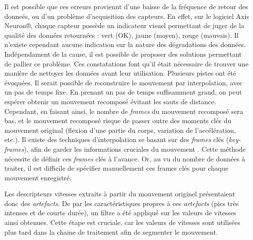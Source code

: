 Il est possible que ces erreurs proviennt d'une baisse de la fréquence de retour des donneés, ou d'un problème d'acquisition des capteurs. En effet, sur le logiciel Axis Neuron®, chaque capteur possède un indicateur visuel permettant de juger de la qualité des données retournées : vert (OK), jaune (moyen), rouge (mauvais). Il n'existe cependant aucune indication sur la nature des dégradations des données. Indépendament de la cause, il est possible de proposer des solutions permettant de pallier ce problème. Ces constatations font qu'il était nécessaire de trouver une manière de nettoyer les données avant leur utilisation. Plusieurs pistes ont été évoquées. Il serait possible de reconstruire le mouvement par interpolation, avec un pas de temps fixe. En prenant un pas de temps suffisamment grand, on peut espérer obtenir un mouvement recomposé évitant les sauts de distance. Cependant, en faisant ainsi, le nombre de \textit{frames} du mouvement recomposé sera bas, et le mouvement recomposé risque de passer outre des moments clés du mouvement original (flexion d'une partie du corps, variation de l'accélération, etc.). Il existe des techniques d'interpolation se basant sur des \textit{frames} clés (\textit{key-frames}), afin de garder les informations cruciales du mouvement \parencite{Brotman1988MIO}. Cette méthode nécessite de définir ces \textit{frames} clés à l'avance. Or, au vu du nombre de données à traiter, il est difficile de spécifier manuellement ces frames clés pour chaque mouvement enregistré.

Les descripteurs vitesses extraits à partir du mouvement originel présentaient donc des \textit{artefacts}. De par les caractéristiques propres à ces \textit{artefacts} (pics très intenses et de courte durée), un filtre a été appliqué sur les valeurs de vitesses ainsi obtenues. Cette étape est cruciale, car les valeurs de vitesses sont utilisées plus tard dans la chaine de traitement afin de segmenter le mouvement.

